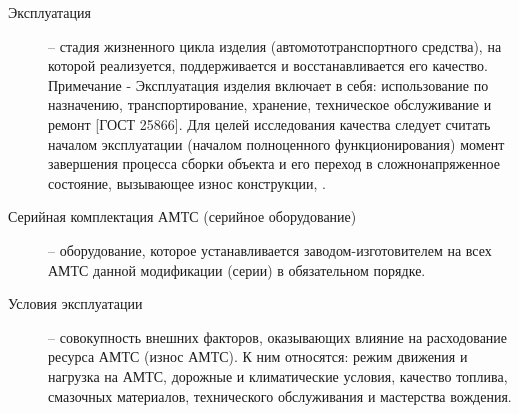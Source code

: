 \begin{description}
	\item
	[Эксплуатация] -- стадия жизненного цикла изделия (автомототранспортного средства), на которой реализуется, поддерживается и восстанавливается его качество. Примечание - Эксплуатация изделия включает в себя: использование по назначению, транспортирование, хранение, техническое обслуживание и ремонт [ГОСТ 25866]. Для целей исследования качества следует считать началом эксплуатации (началом полноценного функционирования) момент завершения процесса сборки объекта и его переход в сложнонапряженное состояние, вызывающее износ конструкции, \cite[3.77]{271022021:gost}.
	
	\item
	[Серийная комплектация  АМТС (серийное оборудование)] -- оборудование, которое устанавливается заводом-изготовителем на всех АМТС данной модификации (серии) в обязательном порядке. 
	
	\item
	[Условия эксплуатации] -- совокупность внешних факторов, оказывающих влияние на расходование ресурса АМТС (износ АМТС). К ним относятся: режим движения и нагрузка на АМТС, дорожные и климатические условия, качество топлива, смазочных материалов, технического обслуживания и мастерства вождения. 
	


\end{description}
